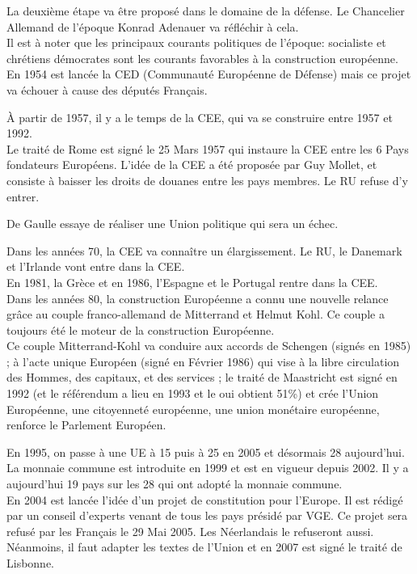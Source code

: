 \documentclass[12pt, a4paper, openany]{book}
\begin{document}
La deuxième étape va être proposé dans le domaine de la défense. Le Chancelier Allemand de l'époque Konrad Adenauer va réfléchir à cela. \\
Il est à noter que les principaux courants politiques de l'époque: socialiste et chrétiens démocrates sont les courants favorables à la construction européenne. \\
En 1954 est lancée la CED (Communauté Européenne de Défense) mais ce projet va échouer à cause des députés Français. 


À partir de 1957, il y a le temps de la CEE, qui va se construire entre 1957 et 1992. \\
Le traité de Rome est signé le 25 Mars 1957 qui instaure la CEE entre les 6 Pays fondateurs Européens. L'idée de la CEE a été proposée par Guy Mollet, et consiste à baisser les droits de douanes entre les pays membres. Le RU refuse d'y entrer.


De Gaulle essaye de réaliser une Union politique qui sera un échec. 


Dans les années 70, la CEE va connaître un élargissement. Le RU, le Danemark et l'Irlande vont entre dans la CEE. \\
En 1981, la Grèce et en 1986, l'Espagne et le Portugal rentre dans la CEE. \\
Dans les années 80, la construction Européenne a connu une nouvelle relance grâce au couple franco-allemand de Mitterrand et Helmut Kohl. Ce couple a toujours été le moteur de la construction Européenne. \\
Ce couple Mitterrand-Kohl va conduire aux accords de Schengen (signés en 1985) ; à l'acte unique Européen (signé en Février 1986) qui vise à la libre circulation des Hommes, des capitaux, et des services ; le traité de Maastricht est signé en 1992 (et le référendum a lieu en 1993 et le oui obtient 51\%) et crée l'Union Européenne, une citoyenneté européenne, une union monétaire européenne, renforce le Parlement Européen. 


En 1995, on passe à une UE à 15 puis à 25 en 2005 et désormais 28 aujourd'hui. \\
La monnaie commune est introduite en 1999 et est en vigueur depuis 2002. Il y a aujourd'hui 19 pays sur les 28 qui ont adopté la monnaie commune. \\
En 2004 est lancée l'idée d'un projet de constitution pour l'Europe. Il est rédigé par un conseil d'experts venant de tous les pays présidé par VGE. Ce projet sera refusé par les Français le 29 Mai 2005. Les Néerlandais le refuseront aussi. \\
Néanmoins, il faut adapter les textes de l'Union et en 2007 est signé le traité de Lisbonne. 
\end{document}
